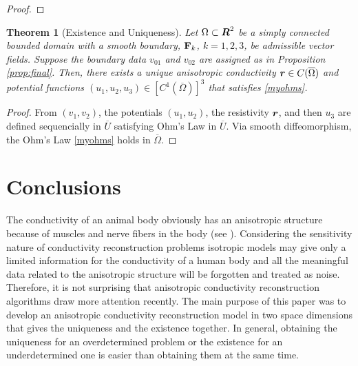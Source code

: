 \documentclass[11pt]{amsart}
\theoremstyle{plain}
\newtheorem{Thm}{Theorem}
\theoremstyle{remark}
\numberwithin{equation}{section}
\numberwithin{Thm}{section}
\def\R{\mbox{\boldmath$R$}}
\def\F{{\bf F}}
\def\r{{\bf r}}
\def\r{\mbox{\boldmath$r$}}
\begin{document}
\begin{proof}
\end{proof}

\begin{Thm}[Existence and Uniqueness] \label{thm:main} Let $\Omega\subset\R^2$ be a simply connected bounded domain with a smooth boundary, $\F_k$, $k=1,2,3$, be admissible vector fields. Suppose the boundary data $v_{01}$ and $v_{02}$ are assigned as in Proposition \ref{prop:final}. Then, there exists a unique anisotropic conductivity $\r\in C(\overline\Omega)$ and potential functions $(u_1,u_2,u_3) \in [C^1(\overline\Omega)]^3$ that satisfies \eqref{myohms}.
\end{Thm}
\begin{proof}
 From $(v_1,v_2)$, the potentials $(u_1,u_2)$, the resistivity $\r$, and then $u_3$ are defined sequencially in $\overline U$ satisfying Ohm's Law in $\overline U$. Via smooth diffeomorphism, the Ohm's Law \eqref{myohms} holds in $\overline \Omega$.
\end{proof}


\section{Conclusions}\label{sect.con}

The conductivity of an animal body obviously has an anisotropic structure because of muscles and nerve fibers in the body (see \cite{Nicholson1965386,Roth2000}). Considering the sensitivity nature of conductivity reconstruction problems isotropic models may give only a limited information for the conductivity of a human body and all the meaningful data related to the anisotropic structure will be forgotten and treated as noise. Therefore, it is not surprising that anisotropic conductivity reconstruction algorithms draw more attention recently. The main purpose of this paper was to develop an anisotropic conductivity reconstruction model in two space dimensions that gives the uniqueness and the existence together. In general, obtaining the uniqueness for an overdetermined problem or the existence for an underdetermined one is easier than obtaining them at the same time. 
\end{document}
